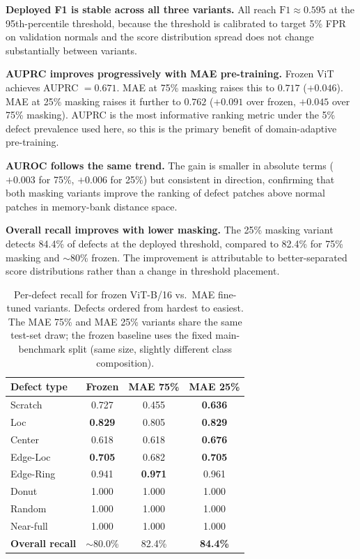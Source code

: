 \documentclass[11pt]{article}
\begin{document}
\textbf{Deployed F1 is stable across all three variants.} All reach $\mathrm{F1}\approx0.595$ at the 95th-percentile threshold, because the threshold is calibrated to target 5\% FPR on validation normals and the score distribution spread does not change substantially between variants.

\textbf{AUPRC improves progressively with MAE pre-training.} Frozen ViT achieves AUPRC $=0.671$. MAE at 75\% masking raises this to $0.717$ ($+0.046$). MAE at 25\% masking raises it further to $0.762$ ($+0.091$ over frozen, $+0.045$ over 75\% masking). AUPRC is the most informative ranking metric under the 5\% defect prevalence used here, so this is the primary benefit of domain-adaptive pre-training.

\textbf{AUROC follows the same trend.} The gain is smaller in absolute terms ($+0.003$ for 75\%, $+0.006$ for 25\%) but consistent in direction, confirming that both masking variants improve the ranking of defect patches above normal patches in memory-bank distance space.

\textbf{Overall recall improves with lower masking.} The 25\% masking variant detects 84.4\% of defects at the deployed threshold, compared to 82.4\% for 75\% masking and $\sim$80\% frozen. The improvement is attributable to better-separated score distributions rather than a change in threshold placement.

\begin{table}[H]
\centering
\caption{Per-defect recall for frozen ViT-B/16 vs.\ MAE fine-tuned variants. Defects ordered from hardest to easiest. The MAE 75\% and MAE 25\% variants share the same test-set draw; the frozen baseline uses the fixed main-benchmark split (same size, slightly different class composition).}
\label{tab:vit_mae_per_defect}
\begin{tabular}{lccc}
\toprule
\textbf{Defect type} & \textbf{Frozen} & \textbf{MAE 75\%} & \textbf{MAE 25\%} \\
\midrule
Scratch   & 0.727 & 0.455 & \textbf{0.636} \\
Loc       & \textbf{0.829} & 0.805 & \textbf{0.829} \\
Center    & 0.618 & 0.618 & \textbf{0.676} \\
Edge-Loc  & \textbf{0.705} & 0.682 & \textbf{0.705} \\
Edge-Ring & 0.941 & \textbf{0.971} & 0.961 \\
Donut     & 1.000 & 1.000 & 1.000 \\
Random    & 1.000 & 1.000 & 1.000 \\
Near-full & 1.000 & 1.000 & 1.000 \\
\midrule
\textbf{Overall recall} & ${\sim}$80.0\% & 82.4\% & \textbf{84.4\%} \\
\bottomrule
\end{tabular}
\end{table}
\end{document}
